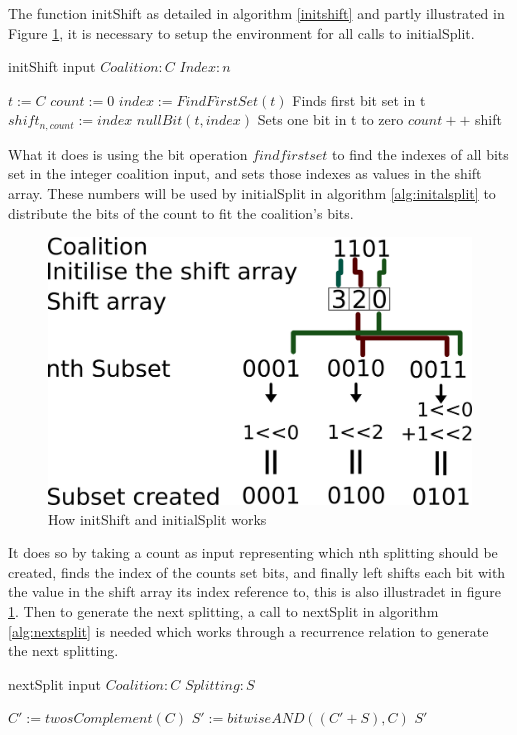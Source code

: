 \documentclass{llncs}
\begin{document}
The function initShift as detailed in algorithm \ref{initshift} and partly illustrated in Figure \ref{fig:howitworks}, 
it is necessary to setup the environment for all calls to initialSplit. 
\begin{algorithm}
\caption{initShift input $Coalition:C$ $Index:n$ \label{initshift}}
\begin{algorithmic}[1]
\STATE $t :=C$
\STATE $count := 0$
 { 
\STATE $index := FindFirstSet(t)$ \hfill Finds first bit set in t
\STATE $shift_{n,count} := index$ 
\STATE $nullBit(t,index)$ \hfill Sets one bit in t to zero
\STATE $count++$
}
\ENDWHILE
\RETURN shift
\end{algorithmic}
\end{algorithm}


What it does is using the bit operation $find first set$ to find the indexes of all bits set
in the integer coalition input, and sets those indexes as values in the shift array.
These numbers will be used by initialSplit in algorithm \ref{alg:initalsplit} to distribute the bits of the count to fit the coalition's bits.
\begin{figure}[htbp]
\centering
\includegraphics[width=0.5\linewidth]{test}
\caption{How initShift and initialSplit works\label{fig:howitworks}}
\end{figure}

It does so by taking a count as input representing which nth splitting should be created, finds the index of the counts 
set bits, and finally left shifts each bit with the value in the shift array its index reference to, 
this is also illustradet in figure \ref{fig:howitworks}.
Then to generate the next splitting, a call to nextSplit in algorithm \ref{alg:nextsplit} is needed which works through a recurrence relation to generate the next splitting.

\begin{algorithm}
\caption{ nextSplit input $Coalition:C$ $Splitting:S$\label{alg:nextsplit}}
\begin{algorithmic}[1]
\STATE $C' := twosComplement(C)$
\STATE $S' := bitwiseAND((C'+S),C)$
\RETURN $S'$
\end{algorithmic}
\end{algorithm}
\end{document}
